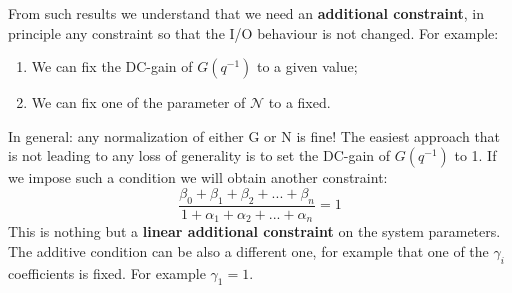 From such results we understand that we need an \textbf{additional constraint}, in principle any constraint so that the I/O behaviour is not changed. For example: 
\begin{enumerate}
    \itemsep-0.2em
    \item We can fix the DC-gain of $G(q^{-1})$ to a given value;
    \item We can fix one of the parameter of $\mathcal{N}$ to a fixed.
\end{enumerate}
In general: any normalization of either G or N is fine! The easiest approach that is not leading to any loss of generality is to set the DC-gain of $G(q^{-1})$ to 1. If we impose such a condition we will obtain another constraint:
\begin{equation}
    \frac{\beta_0+\beta_1+\beta_2+...+\beta_n}{1+\alpha_1+\alpha_2+...+\alpha_n}=1
\end{equation}
This is nothing but a \textbf{linear additional constraint} on the system parameters. The additive condition can be also a different one, for example that one of the $\gamma_i$ coefficients is fixed. For example $\gamma_1=1$.


